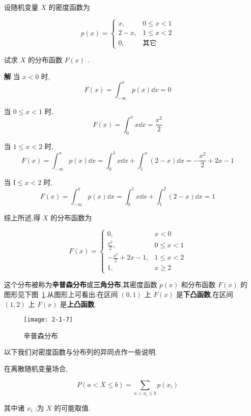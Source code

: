 \begin{example}\label{exam:2.1.8}
	设随机变量 $ X $ 的密度函数为
	
	\[ 
	p(x)=\left\{\begin{array}{ll}{x,} & {0 \leqslant x<1} \\ {2-x,} & {1 \leqslant x<2} \\ {0,} & {\text{其它}}\end{array}\right.
	\]
	
	试求 $ X $ 的分布函数 $ F(x) $ .
	
	\textbf{解} 当 $ x<0 $ 时,
	\[ 
	F(x)=\int_{-\infty}^{x} p(x) \dd x=0
	\]
	
	当 $ 0 \leqslant x<1 $ 时,
	\[ 
	F(x)=\int_{0}^{x} x \dd x=\frac{x^{2}}{2}
	\]
	
	当 $ 1 \leqslant x<2 $ 时,
	\[ 
	F(x)=\int_{-\infty}^{x} p(x) \dd x=\int_{0}^{1} x \dd x+\int_{1}^{x}(2-x) \dd x=-\frac{x^{2}}{2}+2 x-1
	\]
	
	当 $ \mathrm{I} \leqslant x<2 $ 时,
	\[ 
	F(x)=\int_{-\infty}^{x} p(x) \dd x=\int_{0}^{1} x \dd x+\int_{1}^{2}(2-x) \dd x=1
	\]
	
	综上所述,得 $ X $ 的分布函数为
	
	\[ 
	F(x)=\left\{\begin{array}{ll}
	{0,} & {x<0} \\ 
	{\frac{x^{2}}{2},} & {0 \leqslant x<1} \\ 
	{-\frac{x^{2}}{2}+2 x-1,} & {1 \leqslant x<2} \\ 
	{1,} & {x \geqslant 2}
	\end{array}\right.
	\]
\end{example}

这个分布被称为\textbf{辛普森分布}或\textbf{三角分布},其密度函数 $ p(x) $ 和分布函数 $ F(x) $ 的图形见下图~\ref{fig:2.1.7}.从图形上可看出:在区间 $ (0,1) $ 上 $ F(x) $ 是\textbf{下凸函数},在区间 $ (1,2) $ 上 $ F(x) $ 是\textbf{上凸函数}.

\begin{figure}
	\centering
	\texttt{[image: 2-1-7]}
	\caption{辛普森分布}
	\label{fig:2.1.7}
\end{figure}

以下我们对密度函数与分布列的异同点作一些说明.

在离散随机变量场合,

\[ 
P(a<X \leqslant b)=\sum_{a<x_{i} \leqslant b} p\left(x_{i}\right)
\]

其中诸 $ x_i $ ;为 $ X $ 的可能取值.

